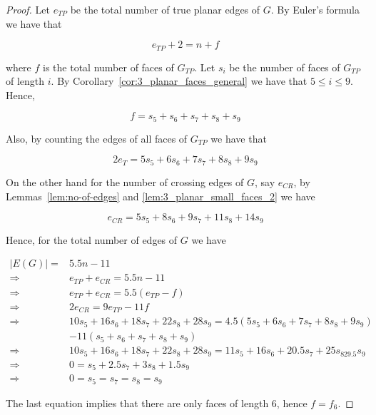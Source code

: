  \begin{proof}
  Let $e_{TP}$ be the total number of true planar edges of $G$. By Euler's formula we have that
  
  \begin{equation}
   e_{TP}+2=n+f
  \end{equation}
  
  where $f$ is the total number of faces of $G_{TP}$. Let $s_i$ be the number of faces of $G_{TP}$ of length $i$. By Corollary~\ref{cor:3_planar_faces_general} we have that $5\leq i\leq 9$. Hence,
  
  \begin{equation}
   f=s_5+s_6+s_7+s_8+s_9
  \end{equation}

  Also, by counting the edges of all faces of $G_{TP}$ we have that
  
  \begin{equation}
   2e_{T}=5s_5+6s_6+7s_7+8s_8+9s_9
  \end{equation}

  On the other hand for the number of crossing edges of $G$, say $e_{CR}$, by Lemmas~\ref{lem:no-of-edges} and \ref{lem:3_planar_small_faces_2} we have
  
  \begin{equation}
   e_{CR}=5s_5+8s_6+9s_7+11s_8+14s_9
  \end{equation}

  Hence, for the total number of edges of $G$ we have 
  

  $\begin{array}{ll}
   |E(G)|= & 5.5n-11\\
    \Rightarrow &e_{TP}+e_{CR}= 5.5n-11\\
    \Rightarrow &e_{TP}+e_{CR}= 5.5(e_{TP}-f)\\
    \Rightarrow &2e_{CR}= 9e_{TP}-11f\\
    \Rightarrow &10s_5+16s_6+18s_7+22s_8+28s_9 = 4.5(5s_5+6s_6+7s_7+8s_8+9s_9)\\
   &-11(s_5+s_6+s_7+s_8+s_9)\\
    \Rightarrow &10s_5+16s_6+18s_7+22s_8+28s_9=11s_5+16s_6+20.5s_7+25s_829.5s_9\\
    \Rightarrow &0= s_5+2.5s_7+3s_8+1.5s_9\\
   \Rightarrow &0=s_5=s_7=s_8=s_9
  \end{array}$

The last equation implies that there are only faces of length $6$, hence $f=f_6$.
 \end{proof}

